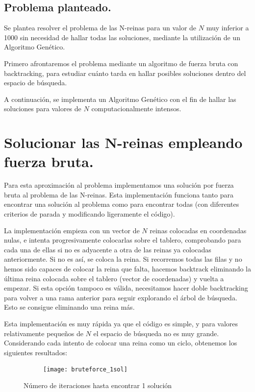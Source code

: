 \documentclass[12pt]{article}
\begin{document}
\subsection{Problema planteado.}
Se plantea resolver el problema de las N-reinas para un valor de $N$ muy inferior a 1000 sin necesidad de hallar todas las soluciones, mediante la utilización de un Algoritmo Genético.

Primero afrontaremos el problema mediante un algoritmo de fuerza bruta con backtracking, para estudiar cuánto tarda en hallar posibles soluciones dentro del espacio de búsqueda.

A continuación, se implementa un Algoritmo Genético con el fin de hallar las soluciones para valores de $N$ computacionalmente intensos.

\section{Solucionar las N-reinas empleando fuerza bruta.}

Para esta aproximación al problema implementamos una solución por fuerza bruta al problema de las N-reinas. Esta implementación funciona tanto para encontrar una solución al problema como para encontrar todas (con diferentes criterios de parada y modificando ligeramente el código).

La implementación empieza con un vector de $N$ reinas colocadas en coordenadas nulas, e intenta progresivamente colocarlas sobre el tablero, comprobando para cada una de ellas si no es adyacente a otra de las reinas ya colocadas anteriormente. Si no es así, se coloca la reina. Si recorremos todas las filas y no hemos sido capaces de colocar la reina que falta, hacemos backtrack eliminando la última reina colocada sobre el tablero (vector de coordenadas) y vuelta a empezar. Si esta opción tampoco es válida, necesitamos hacer doble backtracking para volver a una rama anterior para seguir explorando el árbol de búsqueda. Esto se consigue eliminando una reina más.

Esta implementación es muy rápida ya que el código es simple, y para valores relativamente pequeños de $N$ el espacio de búsqueda no es muy grande. Considerando cada intento de colocar una reina como un ciclo, obtenemos los siguientes resultados:

\begin{figure}[h]
    \center
    \begin{subfigure}{.80\textwidth}
        \texttt{[image: bruteforce\_1sol]}
    \end{subfigure}
    \caption{Número de iteraciones hasta encontrar 1 solución}
\end{figure}
\end{document}
